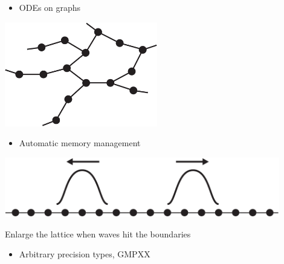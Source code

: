 \begin{frame}[fragile]


\vspace{2ex}

\begin{minipage}[c]{0.35\textwidth}
\begin{itemize}\item ODEs on graphs\end{itemize}
\end{minipage} \hspace{1ex}
\begin{minipage}[c]{0.6\textwidth}
\includegraphics[draft=false,width=0.5\textwidth]{graph.jpg}
\end{minipage}
\pause

\vspace{2ex}
\begin{minipage}[c]{0.35\textwidth}
\begin{itemize}\item Automatic memory management\end{itemize}
\end{minipage} \hspace{1ex}
\begin{minipage}[c]{0.6\textwidth}
\includegraphics[draft=false,width=0.9\textwidth]{self_expanding_lattice.pdf}

\vspace{0.5ex}
{\scriptsize Enlarge the lattice when waves hit the boundaries}
\end{minipage}
\pause

\vspace{2ex}
\begin{itemize}\item Arbitrary precision types, GMPXX\end{itemize}



\end{frame}
